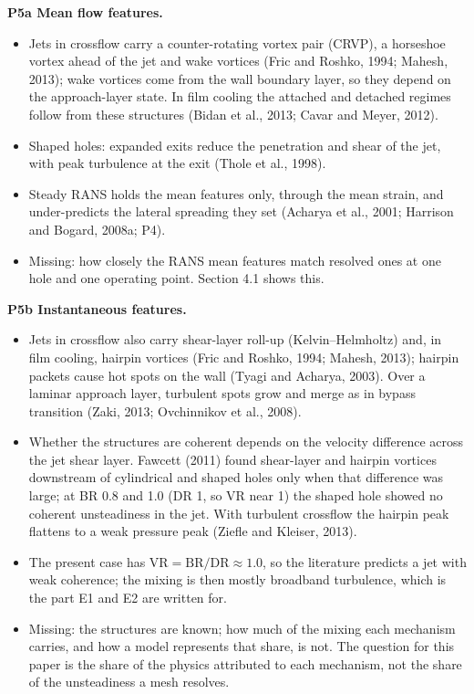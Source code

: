 \documentclass[10pt]{article}
\begin{document}
\textbf{P5a Mean flow features.}
\begin{itemize}
\item Jets in crossflow carry a counter-rotating vortex pair (CRVP), a horseshoe vortex ahead of the jet and wake
  vortices (Fric and Roshko, 1994; Mahesh, 2013); wake vortices come from the wall boundary layer, so they depend
  on the approach-layer state. In film cooling the attached and detached regimes follow from these structures
  (Bidan et al., 2013; Cavar and Meyer, 2012).
\item Shaped holes: expanded exits reduce the penetration and shear of the jet, with peak turbulence at the exit
  (Thole et al., 1998).
\item Steady RANS holds the mean features only, through the mean strain, and under-predicts the lateral spreading
  they set (Acharya et al., 2001; Harrison and Bogard, 2008a; P4).
\item Missing: how closely the RANS mean features match resolved ones at one hole and one operating point.
  Section 4.1 shows this.
\end{itemize}

\textbf{P5b Instantaneous features.}
\begin{itemize}
\item Jets in crossflow also carry shear-layer roll-up (Kelvin--Helmholtz) and, in film cooling, hairpin vortices
  (Fric and Roshko, 1994; Mahesh, 2013); hairpin packets cause hot spots on the wall (Tyagi and Acharya, 2003).
  Over a laminar approach layer, turbulent spots grow and merge as in bypass transition (Zaki, 2013; Ovchinnikov
  et al., 2008).
\item Whether the structures are coherent depends on the velocity difference across the jet shear layer.
  Fawcett (2011) found shear-layer and hairpin vortices downstream of cylindrical and shaped holes only when that
  difference was large; at BR 0.8 and 1.0 (DR 1, so VR near 1) the shaped hole showed no coherent unsteadiness
  in the jet. With turbulent crossflow the hairpin peak flattens to a weak pressure peak (Ziefle and Kleiser,
  2013).
\item The present case has $\mathrm{VR}=\mathrm{BR}/\mathrm{DR}\approx1.0$, so the literature predicts a jet
  with weak coherence; the mixing is then mostly broadband turbulence, which is the part E1 and E2 are written
  for.
\item Missing: the structures are known; how much of the mixing each mechanism carries, and how a model
  represents that share, is not. The question for this paper is the share of the physics attributed to each
  mechanism, not the share of the unsteadiness a mesh resolves.
\end{itemize}
\end{document}
